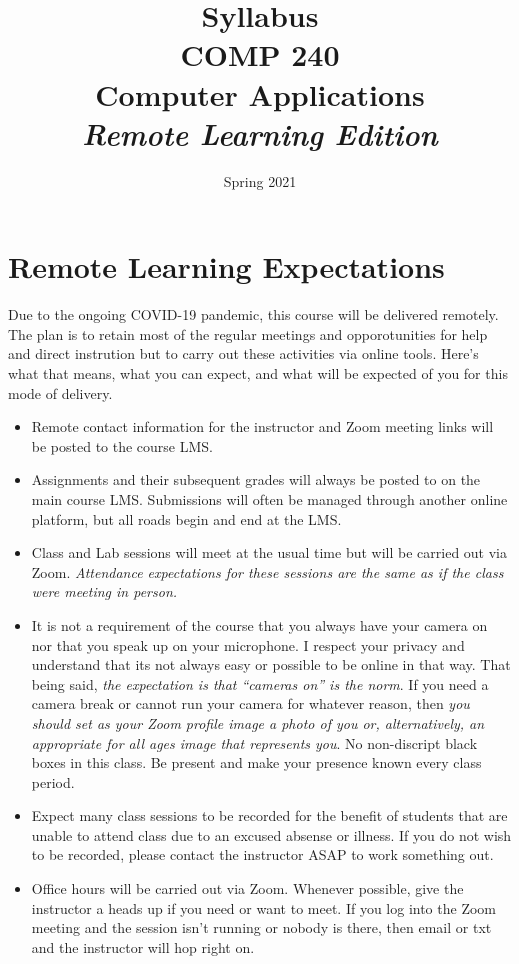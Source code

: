 \documentclass[10pt]{article}
\title{Syllabus \\ COMP 240 \\ Computer Applications \\ \textit{Remote Learning Edition}}
\author{  }
\date{Spring 2021}
\begin{document}
\maketitle

\section{Remote Learning Expectations}

Due to the ongoing COVID-19 pandemic, this course will be delivered remotely. The plan
is to retain most of the regular meetings and opporotunities for help and direct instrution
but to carry out these activities via online tools. Here's what that means, what you can expect,
and what will be expected of you for this mode of delivery.

\begin{itemize}
  \item Remote contact information for the instructor and Zoom meeting links will be posted to the
  course LMS.

  \item Assignments and their subsequent grades will always be posted to on the main course LMS. Submissions will often be managed through another online platform, but all roads begin and end at the LMS.

  \item Class and Lab sessions will meet at the usual time but will be carried out
  via Zoom. \textit{Attendance expectations for these sessions are the same as
  if the class were meeting in person.}

  \item It is not a requirement of the course that you always have your camera on nor
  that you speak up on your microphone. I respect your privacy and understand that its not
  always easy or possible to be online in that way. That being said, \textit{the expectation
  is that ``cameras on'' is the norm}. If you need a camera break or cannot run your camera for
  whatever reason, then \textit{you should set as your Zoom profile image a photo of you or,
  alternatively, an appropriate for all ages image that represents you}. No non-discript black
  boxes in this class. Be present and make your presence known every class period.

  \item Expect many class sessions to be recorded for the benefit of students that
  are unable to attend class due to an excused absense or illness. If you do not wish
  to be recorded, please contact the instructor ASAP to work something out.

  \item Office hours will be carried out via Zoom. Whenever possible, give the
  instructor a heads up if you need or want to meet. If you log into the Zoom meeting
  and the session isn't running or nobody is there, then email or txt and the instructor
  will hop right on.

\end{itemize}
\end{document}
